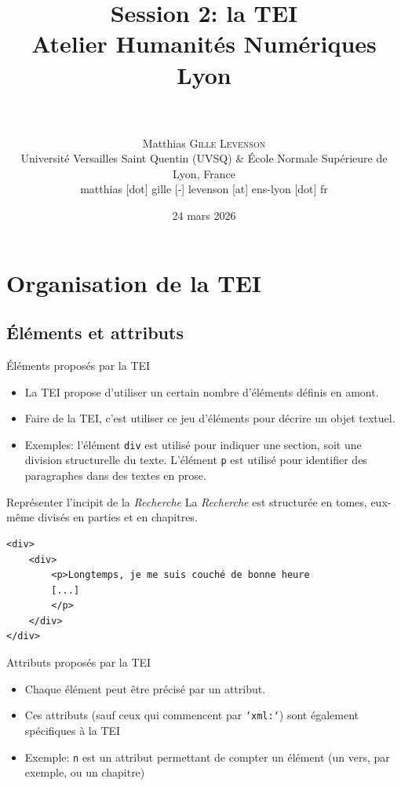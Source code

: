 \documentclass[11pt,aspectratio=1610]{beamer}
\date[24 mars 2026]{24 mars 2026}
\author[Matthias \textsc{Gille Levenson}]{\\~\\ Matthias \textsc{Gille Levenson}\\   {\scriptsize Université Versailles Saint Quentin (UVSQ) \& École Normale Supérieure de Lyon, France}\\ {\tiny matthias [dot] gille [-] levenson [at] ens-lyon [dot] fr}\vspace{-1cm}}
\title[La TEI]{Session 2: la TEI\\ {\small Atelier Humanités Numériques \\ Lyon}}
\begin{document}
\maketitle

\section{Organisation de la TEI}

\subsection{Éléments et attributs}

\begin{frame}{Éléments proposés par la TEI}
\begin{itemize}
\item La TEI propose d'utiliser un certain nombre d'éléments définis en amont. 
\item Faire de la TEI, c'est utiliser ce jeu d'éléments pour décrire un objet textuel.
\item Exemples: l'élément \texttt{div} est utilisé pour indiquer une section, soit une division structurelle du texte. L'élément \texttt{p} est utilisé pour identifier des paragraphes dans des textes en prose. 
\end{itemize}
\end{frame}

\begin{frame}[containsverbatim]{Représenter l'incipit de la \textit{Recherche}}
La \textit{Recherche} est structurée en tomes, eux-même divisés en parties et en chapitres.
\begin{verbatim}
<div>
    <div>
        <p>Longtemps, je me suis couché de bonne heure 
        [...]
        </p>
    </div>
</div>
\end{verbatim}
\end{frame}

\begin{frame}{Attributs proposés par la TEI}
\begin{itemize}
\item Chaque élément peut être précisé par un attribut.
\item Ces attributs (sauf ceux qui commencent par \texttt{`xml:`}) sont également spécifiques à la TEI
\item Exemple: \texttt{n} est un attribut permettant de compter un élément (un vers, par exemple, ou un chapitre)

\end{itemize}
\end{frame}
\end{document}
